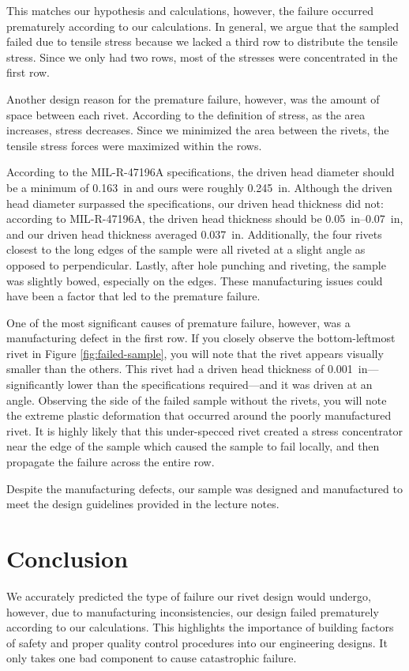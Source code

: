 \documentclass[12 pt]{article}
\begin{document}
This matches our hypothesis and calculations, however, the failure occurred prematurely according to our calculations. In general, we argue that the sampled failed due to tensile stress because we lacked a third row to distribute the tensile stress. Since we only had two rows, most of the stresses were concentrated in the first row.

Another design reason for the premature failure, however, was the amount of space between each rivet. According to the definition of stress, as the area increases, stress decreases. Since we minimized the area between the rivets, the tensile stress forces were maximized within the rows.

According to the MIL-R-47196A specifications, the driven head diameter should be a minimum of \qty{0.163}{in} and ours were roughly \qty{0.245}{in}. Although the driven head diameter surpassed the specifications, our driven head thickness did not: according to MIL-R-47196A, the driven head thickness should be \qtyrange{0.05}{0.07}{in}, and our driven head thickness averaged \qty{0.037}{in}. Additionally, the four rivets closest to the long edges of the sample were all riveted at a slight angle as opposed to perpendicular. Lastly, after hole punching and riveting, the sample was slightly bowed, especially on the edges. These manufacturing issues could have been a factor that led to the premature failure.

One of the most significant causes of premature failure, however, was a manufacturing defect in the first row. If you closely observe the bottom-leftmost rivet in Figure \ref{fig:failed-sample}, you will note that the rivet appears visually smaller than the others. This rivet had a driven head thickness of \qty{0.001}{in}---significantly lower than the specifications required---and it was driven at an angle. Observing the side of the failed sample without the rivets, you will note the extreme plastic deformation that occurred around the poorly manufactured rivet. It is highly likely that this under-specced rivet created a stress concentrator near the edge of the sample which caused the sample to fail locally, and then propagate the failure across the entire row.

Despite the manufacturing defects, our sample was designed and manufactured to meet the design guidelines provided in the lecture notes. 

\section{Conclusion} \label{conclusion-section}
We accurately predicted the type of failure our rivet design would undergo, however, due to manufacturing inconsistencies, our design failed prematurely according to our calculations. This highlights the importance of building factors of safety and proper quality control procedures into our engineering designs. It only takes one bad component to cause catastrophic failure.
\end{document}
